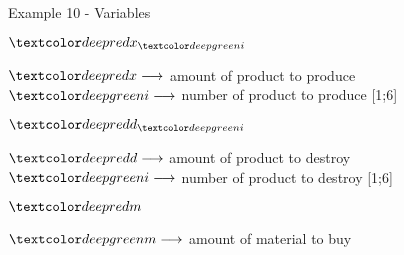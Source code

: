 \begin{frame}{Example 10 - Variables}
\begin{multicols}{3}

\begin{center}
\Huge{
$\colora{x}_{\colorb{i}}$
}
\end{center}
\normalsize{
$\colora{x} \longrightarrow$
    amount of product to produce  \\
$\colorb{i} \longrightarrow$
    number of product to produce [1;6]
}
\vfill
\columnbreak


\begin{center}
\Huge{
$\colora{d}_{\colorb{i}}$
}
\end{center}
\normalsize{
$\colora{d} \longrightarrow$
    amount of product to destroy  \\
$\colorb{i} \longrightarrow$
    number of product to destroy [1;6]
}
\vfill
\columnbreak


\begin{center}
\Huge{
$\colora{m}$
}
\end{center}
\normalsize{
$\colorb{m} \longrightarrow$
    amount of material to buy
}

\end{multicols}
\end{frame}
